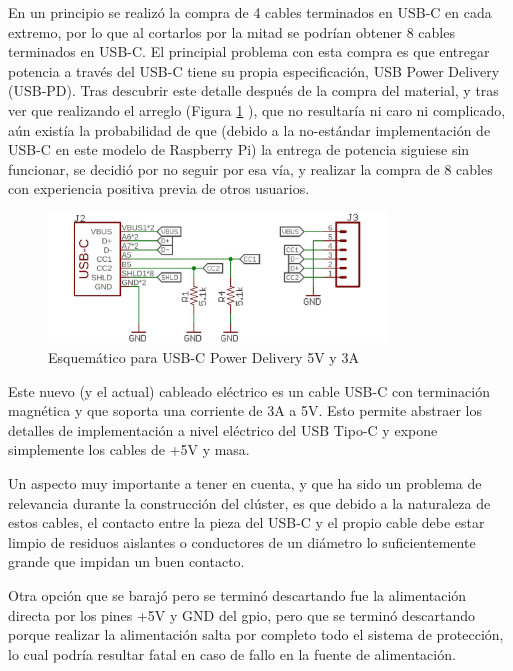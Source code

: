 En un principio se realizó la compra de 4 cables terminados en USB-C en cada extremo, por lo que al cortarlos por la mitad se podrían obtener 8 cables terminados en USB-C. El principial problema con esta compra es que entregar potencia a través del USB-C tiene su propia especificación, USB Power Delivery (USB-PD). Tras descubrir este detalle después de la compra del material, y tras ver que realizando el arreglo (Figura \ref{fig:usb_pd_schematic} \cite{usb_pd_techforum}), que no resultaría ni caro ni complicado, aún existía la probabilidad de que (debido a la no-estándar implementación de USB-C en este modelo de Raspberry Pi) la entrega de potencia siguiese sin funcionar, se decidió por no seguir por esa vía, y realizar la compra de 8 cables con experiencia positiva previa de otros usuarios.

\begin{figure}[h!]
  \vspace*{0.5cm}
  \centering
  \includegraphics[width=0.8\textwidth]{img/usb_pd_schematic.jpg}
  \caption{Esquemático para USB-C Power Delivery 5V y 3A}
  \label{fig:usb_pd_schematic}
  \vspace*{0.1cm}
\end{figure}

Este nuevo (y el actual) cableado eléctrico es un cable USB-C con terminación magnética y que soporta una corriente de 3A a 5V. Esto permite abstraer los detalles de implementación a nivel eléctrico del USB Tipo-C y expone simplemente los cables de +5V y masa.

Un aspecto muy importante a tener en cuenta, y que ha sido un problema de relevancia durante la construcción del clúster, es que debido a la naturaleza de estos cables, el contacto entre la pieza del USB-C y el propio cable debe estar limpio de residuos aislantes o conductores de un diámetro lo suficientemente grande que impidan un buen contacto.

Otra opción que se barajó pero se terminó descartando fue la alimentación directa por los pines +5V y GND del \acrshort{gpio}, pero que se terminó descartando porque realizar la alimentación salta por completo todo el sistema de protección, lo cual podría resultar fatal en caso de fallo en la fuente de alimentación.

